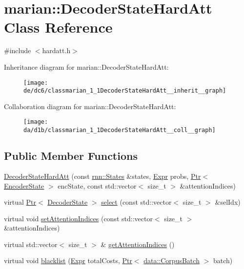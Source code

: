 \hypertarget{classmarian_1_1DecoderStateHardAtt}{}\section{marian\+:\+:Decoder\+State\+Hard\+Att Class Reference}
\label{classmarian_1_1DecoderStateHardAtt}


{\ttfamily \#include $<$hardatt.\+h$>$}



Inheritance diagram for marian\+:\+:Decoder\+State\+Hard\+Att\+:
\nopagebreak
\begin{figure}[H]
\begin{center}
\leavevmode
\texttt{[image: de/dc6/classmarian\_1\_1DecoderStateHardAtt\_\_inherit\_\_graph]}
\end{center}
\end{figure}


Collaboration diagram for marian\+:\+:Decoder\+State\+Hard\+Att\+:
\nopagebreak
\begin{figure}[H]
\begin{center}
\leavevmode
\texttt{[image: da/d1b/classmarian\_1\_1DecoderStateHardAtt\_\_coll\_\_graph]}
\end{center}
\end{figure}
\subsection*{Public Member Functions}
\begin{DoxyCompactItemize}
\item 
\hyperlink{classmarian_1_1DecoderStateHardAtt_a882378ac0b86757013b44582049d3823}{Decoder\+State\+Hard\+Att} (const \hyperlink{classmarian_1_1rnn_1_1States}{rnn\+::\+States} \&states, \hyperlink{namespacemarian_a498d8baf75b754011078b890b39c8e12}{Expr} probs, \hyperlink{namespacemarian_ad1a373be43a00ef9ce35666145137b08}{Ptr}$<$ \hyperlink{classmarian_1_1EncoderState}{Encoder\+State} $>$ enc\+State, const std\+::vector$<$ size\+\_\+t $>$ \&attention\+Indices)
\item 
virtual \hyperlink{namespacemarian_ad1a373be43a00ef9ce35666145137b08}{Ptr}$<$ \hyperlink{classmarian_1_1DecoderState}{Decoder\+State} $>$ \hyperlink{classmarian_1_1DecoderStateHardAtt_adc303898f195c6db90b67dab9444f4f1}{select} (const std\+::vector$<$ size\+\_\+t $>$ \&sel\+Idx)
\item 
virtual void \hyperlink{classmarian_1_1DecoderStateHardAtt_afcc7783d427f92534005f363967db1f2}{set\+Attention\+Indices} (const std\+::vector$<$ size\+\_\+t $>$ \&attention\+Indices)
\item 
virtual std\+::vector$<$ size\+\_\+t $>$ \& \hyperlink{classmarian_1_1DecoderStateHardAtt_a777750790cb5c41c3d429ef46e01f1ad}{get\+Attention\+Indices} ()
\item 
virtual void \hyperlink{classmarian_1_1DecoderStateHardAtt_a467625af0dfe9d6f08ce69484d4e1799}{blacklist} (\hyperlink{namespacemarian_a498d8baf75b754011078b890b39c8e12}{Expr} total\+Costs, \hyperlink{namespacemarian_ad1a373be43a00ef9ce35666145137b08}{Ptr}$<$ \hyperlink{classmarian_1_1data_1_1CorpusBatch}{data\+::\+Corpus\+Batch} $>$ batch)
\end{DoxyCompactItemize}

